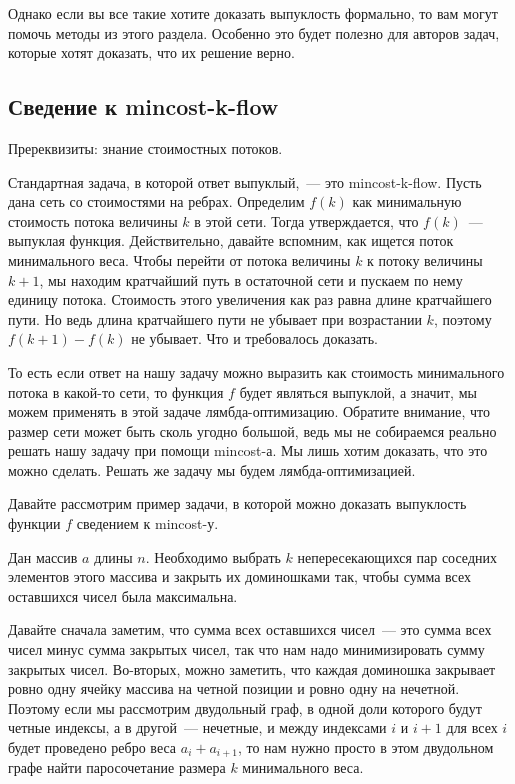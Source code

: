 Однако если вы все такие хотите доказать выпуклость формально, то вам могут помочь методы из этого раздела. Особенно это будет полезно для авторов задач, которые хотят доказать, что их решение верно.

\subsection{Сведение к mincost-k-flow}

Пререквизиты: знание стоимостных потоков.

Стандартная задача, в которой ответ выпуклый,~--- это mincost-k-flow. Пусть дана сеть со стоимостями на ребрах. Определим $f(k)$ как минимальную стоимость потока величины $k$ в этой сети. Тогда утверждается, что $f(k)$~--- выпуклая функция. Действительно, давайте вспомним, как ищется поток минимального веса. Чтобы перейти от потока величины $k$ к потоку величины $k + 1$, мы находим кратчайший путь в остаточной сети и пускаем по нему единицу потока. Стоимость этого увеличения как раз равна длине кратчайшего пути. Но ведь длина кратчайшего пути не убывает при возрастании $k$, поэтому $f(k + 1) - f(k)$ не убывает. Что и требовалось доказать.

То есть если ответ на нашу задачу можно выразить как стоимость минимального потока в какой-то сети, то функция $f$ будет являться выпуклой, а значит, мы можем применять в этой задаче лямбда-оптимизацию. Обратите внимание, что размер сети может быть сколь угодно большой, ведь мы не собираемся реально решать нашу задачу при помощи mincost-а. Мы лишь хотим доказать, что это можно сделать. Решать же задачу мы будем лямбда-оптимизацией.

Давайте рассмотрим пример задачи, в которой можно доказать выпуклость функции $f$ сведением к mincost-у.

\begin{problem}
    Дан массив $a$ длины $n$. Необходимо выбрать $k$ непересекающихся пар соседних элементов этого массива и закрыть их доминошками так, чтобы сумма всех оставшихся чисел была максимальна.
\end{problem}

Давайте сначала заметим, что сумма всех оставшихся чисел~--- это сумма всех чисел минус сумма закрытых чисел, так что нам надо минимизировать сумму закрытых чисел. Во-вторых, можно заметить, что каждая доминошка закрывает ровно одну ячейку массива на четной позиции и ровно одну на нечетной. Поэтому если мы рассмотрим двудольный граф, в одной доли которого будут четные индексы, а в другой~--- нечетные, и между индексами $i$ и $i + 1$ для всех $i$ будет проведено ребро веса $a_i + a_{i + 1}$, то нам нужно просто в этом двудольном графе найти паросочетание размера $k$ минимального веса.

